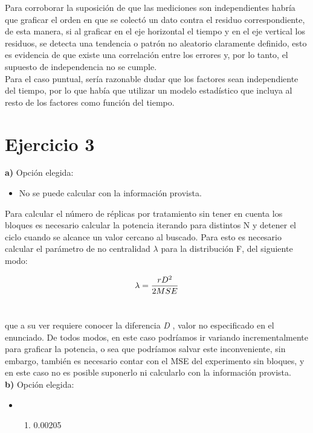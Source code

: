 \documentclass[11pt]{article}
\providecommand{\tightlist}{%
      \setlength{\itemsep}{0pt}\setlength{\parskip}{0pt}}
\begin{document}
Para corroborar la suposición de que las mediciones son independientes
habría que graficar el orden en que se colectó un dato contra el residuo
correspondiente, de esta manera, si al graficar en el eje horizontal el
tiempo y en el eje vertical los residuos, se detecta una tendencia o
patrón no aleatorio claramente definido, esto es evidencia de que existe
una correlación entre los errores y, por lo tanto, el supuesto de
independencia no se cumple.\\

Para el caso puntual, sería razonable dudar que los factores sean
independiente del tiempo, por lo que había que utilizar un modelo
estadístico que incluya al resto de los factores como función del
tiempo.

\clearpage \newpage
{}
    \hypertarget{ejercicio-3}{%
\section*{Ejercicio 3}\label{ejercicio-3}}

    \textbf{a)} Opción elegida:

\begin{itemize}
\tightlist
\item
  No se puede calcular con la información provista.
\end{itemize}

Para calcular el número de réplicas por tratamiento sin tener en cuenta
los bloques es necesario calcular la potencia iterando para distintos N y detener el ciclo cuando se alcance un valor cercano al buscado. Para esto es necesario calcular el parámetro de no centralidad \(\lambda\) para la distribución F, del siguiente modo:

\[\lambda = {{rD^2} \over {2MSE}} \]\

que a su ver requiere conocer la diferencia \emph{D} , valor no especificado en el enunciado. De todos modos, en este caso podríamos ir variando incrementalmente para graficar la potencia, o
sea que podríamos salvar este inconveniente, sin embargo, también es
necesario contar con el MSE del experimento sin bloques, y en este caso
no es posible suponerlo ni calcularlo con la información provista.\\

\textbf{b)} Opción elegida:

\begin{itemize}
\item
  \begin{enumerate}
  \def\labelenumi{\arabic{enumi})}
  \setcounter{enumi}{4}
  \tightlist
  \item
    0.00205
  \end{enumerate}
\end{itemize}
\end{document}
